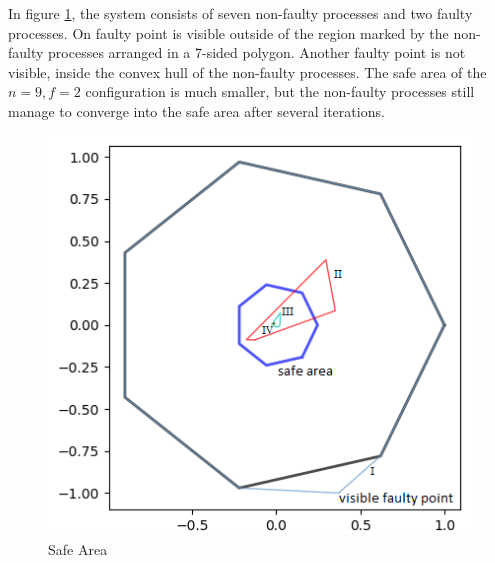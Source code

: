 In figure \ref{fig:M6}, the system consists of seven non-faulty processes and 
two faulty processes. On faulty point is visible outside of the 
region marked by the non-faulty processes arranged in a 7-sided 
polygon. Another faulty point is not visible, inside the convex 
hull of the non-faulty processes. The safe area of the $n=9, f=2$ 
configuration is much smaller, but the non-faulty processes still 
manage to converge into the safe area after several iterations.

\begin{figure}
\includegraphics[scale=0.5]{p2}
\caption{Safe Area} \label{fig:M6}
\end{figure}
